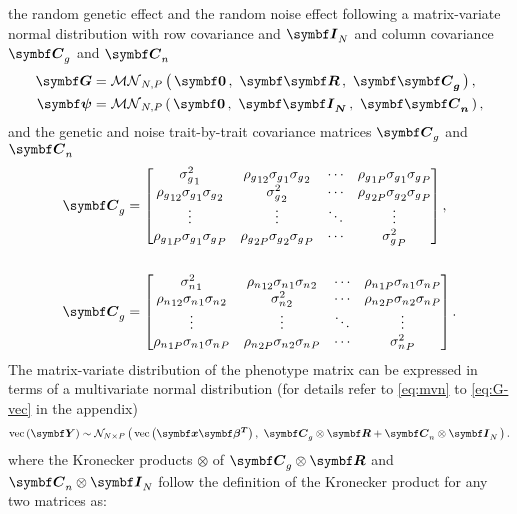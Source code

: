 the random genetic effect  and the random noise effect \tmat{\psi} following a matrix-variate normal distribution with row covariance  and \(\mat{I}_N\) and column covariance \(\mat{C}_g\) and  \(\mat{C}_n\)
\begin{align}
 \mat{G} &= \matrixnormal N P 0 {\mat{R}}{\mat{C}_g},\\
%
 \mat{\psi} &= \matrixnormal N P 0 {\mat{I}_N}{\mat{C}_n},
 \end{align}
%
and the genetic and noise trait-by-trait covariance matrices \(\mat{C}_g\) and  \(\mat{C}_n\) 
%
 \begin{align}
 \mat{C}_g &=
  \begin{bmatrix}
  {\sigma_g^2}_1 &  {\rho_g}_{12} {\sigma_g}_1 {\sigma_g}_2 & \cdots & {\rho_g}_{1P} {\sigma_g}_1 {\sigma_g}_P \\
  {\rho_g}_{12} {\sigma_g}_1 {\sigma_g}_2 & {\sigma_g^2}_2 & \cdots & {\rho_g}_{2P} {\sigma_g}_2 {\sigma_g}_P \\
   \vdots & \vdots & \ddots & \vdots \\
   {\rho_g}_{1P} {\sigma_g}_1 {\sigma_g}_P  &  {\rho_g}_{2P} {\sigma_g}_2 {\sigma_g}_P  & \cdots &{\sigma_g^2}_P 
   \end{bmatrix}, \\ \\
 \mat{C}_g &=
  \begin{bmatrix}
  {\sigma_n^2}_1 &  {\rho_n}_{12} {\sigma_n}_1 {\sigma_n}_2 & \cdots & {\rho_n}_{1P} {\sigma_n}_1 {\sigma_n}_P \\
  {\rho_n}_{12} {\sigma_n}_1 {\sigma_n}_2 & {\sigma_n^2}_2 & \cdots & {\rho_n}_{2P} {\sigma_n}_2 {\sigma_n}_P \\
   \vdots & \vdots & \ddots & \vdots \\
   {\rho_n}_{1P} {\sigma_n}_1 {\sigma_n}_P  &  {\rho_n}_{2P} {\sigma_n}_2 {\sigma_n}_P  & \cdots &{\sigma_n^2}_P 
   \end{bmatrix}.
%
\end{align}
% 
The matrix-variate distribution of the phenotype matrix  can be expressed in terms of a multivariate normal distribution (for details refer to \cref{eq:mvn} to \cref{eq:G-vec} in the appendix)
%
\begin{equation}
\text{vec}\left(\mat{Y}\right) \sim \multinormal N P {\text{vec}\left(\mat{x}\mat{\beta^T}\right)}{\mat{C}_g \otimes \mat{R} + \mat{C}_n \otimes\mat{I}_N}.
\label{eq:lmm-mv-multin}
\end{equation}
%
where the Kronecker products \(\otimes\) of \(\mat{C}_g \otimes \mat{R}\) and \(\mat{C}_n \otimes\mat{I}_N\)  follow the definition of the Kronecker product for any two matrices as:
